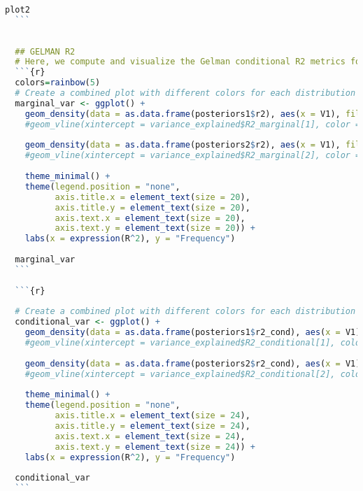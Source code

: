 \begin{lstlisting}[language=R, caption=Usage of the Bayesian Importance package with plots and examples.]
  plot2
  ```
  
  
  ## GELMAN R2
  # Here, we compute and visualize the Gelman conditional R2 metrics for each model. This metric gives insight into the proportion of variance explained by the fixed effects in the models.
  ```{r}
  colors=rainbow(5)
  # Create a combined plot with different colors for each distribution
  marginal_var <- ggplot() +
    geom_density(data = as.data.frame(posteriors1$r2), aes(x = V1), fill = colors[1], alpha = 0.5) +
    #geom_vline(xintercept = variance_explained$R2_marginal[1], color = colors[1], linetype = "dashed") +
    
    geom_density(data = as.data.frame(posteriors2$r2), aes(x = V1), fill = colors[2], alpha = 0.5) +
    #geom_vline(xintercept = variance_explained$R2_marginal[2], color = colors[2], linetype = "dashed") +
    
    theme_minimal() +
    theme(legend.position = "none",
          axis.title.x = element_text(size = 20),
          axis.title.y = element_text(size = 20),
          axis.text.x = element_text(size = 20),
          axis.text.y = element_text(size = 20)) +
    labs(x = expression(R^2), y = "Frequency")
  
  marginal_var
  ```
  
  ```{r}
  
  # Create a combined plot with different colors for each distribution
  conditional_var <- ggplot() +
    geom_density(data = as.data.frame(posteriors1$r2_cond), aes(x = V1), fill = colors[1], alpha = 0.5) +
    #geom_vline(xintercept = variance_explained$R2_conditional[1], color = colors[1], linetype = "dashed") +
    
    geom_density(data = as.data.frame(posteriors2$r2_cond), aes(x = V1), fill = colors[2], alpha = 0.5) +
    #geom_vline(xintercept = variance_explained$R2_conditional[2], color = colors[2], linetype = "dashed") +
    
    theme_minimal() +
    theme(legend.position = "none",
          axis.title.x = element_text(size = 24),
          axis.title.y = element_text(size = 24),
          axis.text.x = element_text(size = 24),
          axis.text.y = element_text(size = 24)) +
    labs(x = expression(R^2), y = "Frequency")
  
  conditional_var
  ```
\end{lstlisting}




